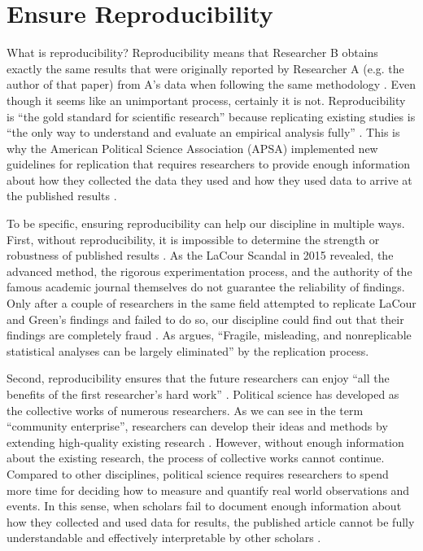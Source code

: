 
\section{Ensure Reproducibility}

What is reproducibility? Reproducibility means that Researcher B obtains exactly the same results that were originally reported by Researcher A (e.g. the author of that paper) from A’s data when following the same methodology \citep{Brunswik1955, Asendorpf2013}. Even though it seems like an unimportant process, certainly it is not. Reproducibility is ``the gold standard for scientific research'' \citep[1]{Janz2015} because replicating existing studies is ``the only way to understand and evaluate an empirical analysis fully'' \citep[444]{King1995}. This is why the American Political Science Association (APSA) implemented new guidelines for replication that requires researchers to provide enough information about how they collected the data they used and how they used data to arrive at the published results \citep{Lupia2014}.

To be specific, ensuring reproducibility can help our discipline in multiple ways. First, without reproducibility, it is impossible to determine the strength or robustness of published results \citep{Lupia2014}. As the LaCour Scandal in 2015 revealed, the advanced method, the rigorous experimentation process, and the authority of the famous academic journal themselves do not guarantee the reliability of findings. Only after a couple of researchers in the same field attempted to replicate LaCour and Green’s findings and failed to do so, our discipline could find out that their findings are completely fraud \citep{Young2015}. As \citet[62]{Dafoe2014} argues, ``Fragile, misleading, and nonreplicable statistical analyses can be largely eliminated'' by the replication process.

Second, reproducibility ensures that the future researchers can enjoy ``all the benefits of the first researcher’s hard work'' \citep[445]{King1995}.  Political science has developed as the collective works of numerous researchers. As we can see in the term ``community enterprise'', researchers can develop their ideas and methods by extending high-quality existing research \citep{King1995}. However, without enough information about the existing research, the process of collective works cannot continue. Compared to other disciplines, political science requires researchers to spend more time for deciding how to measure and quantify real world observations and events. In this sense, when scholars fail to document enough information about how they collected and used data for results, the published article cannot be fully understandable and effectively interpretable by other scholars \citep{Lupia2010}.

